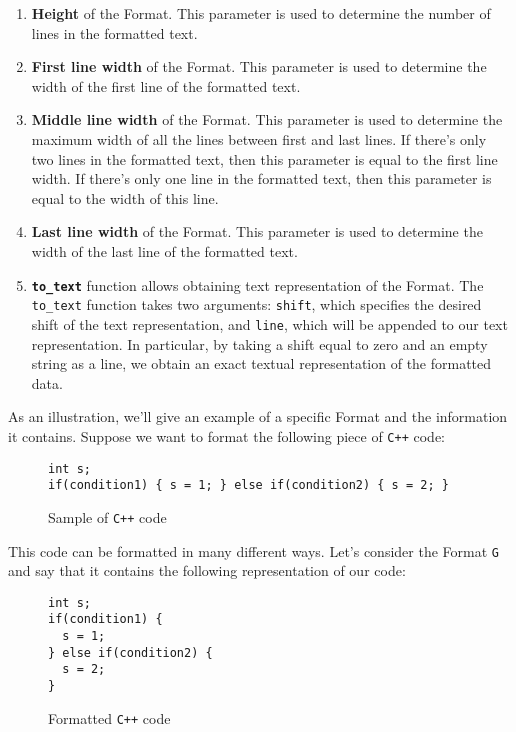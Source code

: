 \documentclass[14pt]{constructor-diploma}
\begin{document}
\begin{enumerate}
  \item \textbf{Height} of the Format. This parameter is used to determine the number of lines in the formatted text.
  \item \textbf{First line width} of the Format. This parameter is used to determine the width of the first line of the formatted text.
  \item \textbf{Middle line width} of the Format. This parameter is used to determine the maximum width of all the lines between first and last lines.
  If there's only two lines in the formatted text, then this parameter is equal to the first line width. 
  If there's only one line in the formatted text, then this parameter is equal to the width of this line.
  \item \textbf{Last line width} of the Format. This parameter is used to determine the width of the last line of the formatted text.
  \item \textbf{\texttt{to\_text}} function allows obtaining text representation of the Format. 
  The \texttt{to\_text} function takes two arguments: 
  \texttt{shift}, which specifies the desired shift of the text representation, and \texttt{line}, 
  which will be appended to our text representation.
  In particular, by taking a shift equal to zero and an empty string as a line, we obtain an exact textual representation of the formatted data.
\end{enumerate}

As an illustration, we'll give an example of a specific Format and the information it contains. 
Suppose we want to format the following piece of \texttt{C++} code:

\begin{figure}[H]

\begin{mdframed}[backgroundcolor=bg]
\begin{verbatim}
int s;
if(condition1) { s = 1; } else if(condition2) { s = 2; }
\end{verbatim}
\end{mdframed}
\caption{Sample of \texttt{C++} code}
\end{figure}

This code can be formatted in many different ways. 
Let's consider the Format \texttt{G} and say that it contains the following representation of our code:

\begin{figure}[H]

\begin{mdframed}[backgroundcolor=bg]
\begin{verbatim}
int s;
if(condition1) { 
  s = 1; 
} else if(condition2) { 
  s = 2; 
}
\end{verbatim}
\end{mdframed}
\caption{Formatted \texttt{C++} code}
\label{fig:format_text}
\end{figure}
\end{document}

